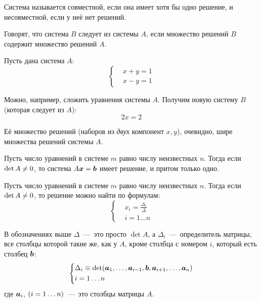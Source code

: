 \documentclass[a4paper,12pt]{article}
\begin{document}
  \begin{definition}
    Система называется совместной, если она имеет хотя бы одно решение, и несовместной, если у неё нет решений.
  \end{definition}
  
  \begin{definition}
    Говорят, что система $B$ следует из системы $A$, если множество решений $B$ содержит множество решений $A$.
  \end{definition}
  
  \begin{example}
    Пусть дана система $A$:
    \[
      \left\{
        \begin{aligned}
          &x + y = 1\\
          &x - y = 1
        \end{aligned}
      \right.
    \]
    
    Можно, например, сложить уравнения системы $A$.
    Получим новую систему $B$ (которая следует из $A$):
    \[
      2x = 2
    \]
    
    Её множество решений (наборов из \emph{двух} компонент $x, y$), очевидно, шире множества решений системы $A$.
  \end{example}
  
 
  
  \begin{theorem}
    Пусть число уравнений в системе $m$ равно числу неизвестных $n$.
    Тогда если $\det A \hm{\not=} 0$, то система $A \bds x \hm= \bds b$ имеет решение, и притом только одно.
  \end{theorem}
  
  \begin{theorem}
    Пусть число уравнений в системе $m$ равно числу неизвестных $n$.
    Тогда если $\det A \hm{\not=} 0$, то решение можно найти по формулам:
    \[
      \left\{
        \begin{aligned}
          &x_i = \frac{\Delta_i}{\Delta}\\
          &i = 1 \ldots n
        \end{aligned}
      \right.
    \]
    
    В обозначениях выше $\Delta$~---~это просто $\det A$, а $\Delta_i$~---~определитель матрицы, все столбцы которой такие же, как у $A$, кроме столбца с номером $i$, который есть столбец $\boldsymbol b$:
    \[
      \left\{
        \begin{aligned}
          &\Delta_i \equiv \det (\boldsymbol a_1, \ldots, \boldsymbol a_{i - 1}, \boldsymbol b, \boldsymbol a_{i + 1}, \ldots, \boldsymbol a_n)\\
          &i = 1 \ldots n
        \end{aligned}
      \right.
    \]
    где $\boldsymbol a_i$, $(i \hm= 1 \ldots n)$~---~это столбцы матрицы $A$.
  \end{theorem}
  
\end{document}
